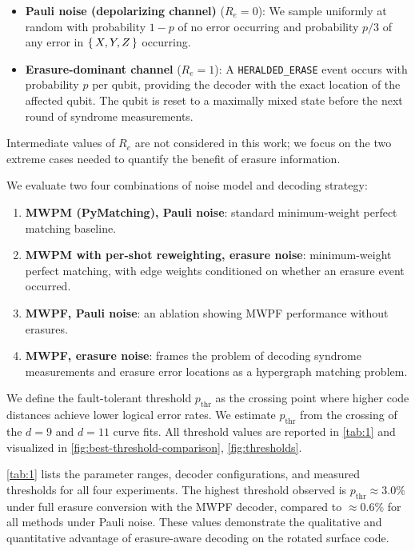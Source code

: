 \documentclass[11pt, notitlepage, letterpaper]{article}
\begin{document}
\begin{itemize}
    \item \textbf{Pauli noise (depolarizing channel)} ($R_e = 0$): We sample uniformly at random with probability $1-p$ of no error occurring and probability $p/3$ of any error in $\set{X, Y, Z}$ occurring.
    \item \textbf{Erasure-dominant channel} ($R_e = 1$): A \verb|HERALDED_ERASE| event occurs with probability $p$ per qubit, providing the decoder with the exact location of the affected qubit. The qubit is reset to a maximally mixed state before the next round of syndrome measurements.
\end{itemize}
Intermediate values of $R_e$ are not considered in this work; we focus on the two extreme cases needed to quantify the benefit of erasure information.

We evaluate two four combinations of noise model and decoding strategy:
\begin{enumerate}
    \item \textbf{MWPM (PyMatching), Pauli noise}: standard minimum-weight perfect matching baseline.
    \item \textbf{MWPM with per-shot reweighting, erasure noise}: minimum-weight perfect matching, with edge weights conditioned on whether an erasure event occurred.
    \item \textbf{MWPF, Pauli noise}: an ablation showing MWPF performance without erasures.
    \item \textbf{MWPF, erasure noise}: frames the problem of decoding syndrome measurements
          and erasure error locations as a hypergraph matching problem.

\end{enumerate}

We define the fault-tolerant threshold $p_{\mathrm{thr}}$ as the crossing point where higher code distances achieve lower logical error rates. We estimate  $p_{\mathrm{thr}}$ from the crossing of the $d=9$ and $d=11$ curve fits. All threshold values are reported in \autoref{tab:1} and visualized in \autoref{fig:best-threshold-comparison}, \autoref{fig:thresholds}.

\autoref{tab:1} lists the parameter ranges, decoder configurations, and measured thresholds for all four experiments. The highest threshold observed is $p_{\mathrm{thr}}\approx 3.0\%$ under full erasure conversion with the MWPF decoder, compared to $\approx 0.6\%$ for all methods under Pauli noise. These values demonstrate the qualitative and quantitative advantage of erasure-aware decoding on the rotated surface code.
\end{document}
